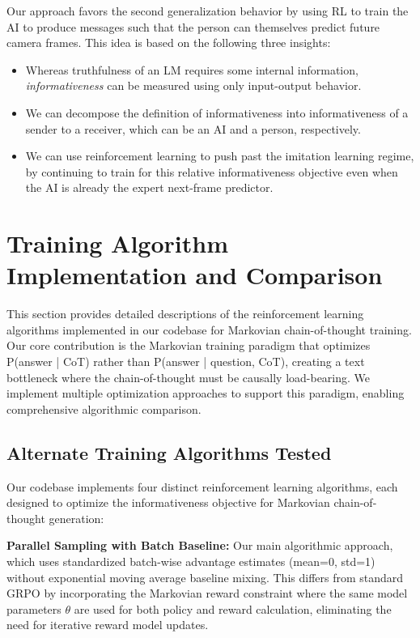 \documentclass{article} %
\begin{document}
Our approach favors the second generalization behavior by using RL to train the AI to produce messages such that the person can themselves predict future camera frames.
This idea is based on the following three insights:
\begin{itemize}
\item Whereas truthfulness of an LM requires some internal information, \emph{informativeness} can be measured using only input-output behavior.
\item We can decompose the definition of informativeness into informativeness of a sender to a receiver, which can be an AI and a person, respectively.
\item We can use reinforcement learning to push past the imitation learning regime, by continuing to train for this relative informativeness objective even when the AI is already the expert next-frame predictor.
\end{itemize}

\section{Training Algorithm Implementation and Comparison}
\label{app:training_algorithms}

This section provides detailed descriptions of the reinforcement learning algorithms implemented in our codebase for Markovian chain-of-thought training. Our core contribution is the Markovian training paradigm that optimizes P(answer | CoT) rather than P(answer | question, CoT), creating a text bottleneck where the chain-of-thought must be causally load-bearing. We implement multiple optimization approaches to support this paradigm, enabling comprehensive algorithmic comparison.

\subsection{Alternate Training Algorithms Tested}

Our codebase implements four distinct reinforcement learning algorithms, each designed to optimize the informativeness objective for Markovian chain-of-thought generation:

\textbf{Parallel Sampling with Batch Baseline:} Our main algorithmic approach, which uses standardized batch-wise advantage estimates (mean=0, std=1) without exponential moving average baseline mixing. This differs from standard GRPO by incorporating the Markovian reward constraint where the same model parameters $\theta$ are used for both policy and reward calculation, eliminating the need for iterative reward model updates.
\end{document}
